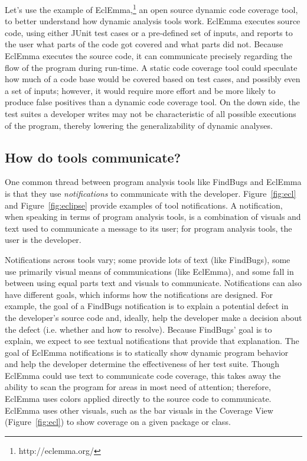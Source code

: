 \documentclass{llncs}
\begin{document}
Let's use the example of EclEmma,\footnote{http://eclemma.org/} an open source dynamic code coverage tool, to better understand how dynamic analysis tools work. EclEmma executes source code, using either JUnit test cases or a pre-defined set of inputs, and reports to the user what parts of the code got covered and what parts did not. Because EclEmma executes the source code, it can communicate precisely regarding the flow of the program during run-time. A static code coverage tool could speculate how much of a code base would be covered based on test cases, and possibly even a set of inputs; however, it would require more effort and be more likely to produce false positives than a dynamic code coverage tool. On the down side, the test suites a developer writes may not be characteristic of all possible executions of the program, thereby lowering the generalizability of dynamic analyses.

\subsection{How do tools communicate?}\label{subsec:comm}

One common thread between program analysis tools like FindBugs and EclEmma is that they use \emph{notifications} to communicate with the developer. Figure~\ref{fig:ecl} and Figure~\ref{fig:eclipse} provide examples of tool notifications. A notification, when speaking in terms of program analysis tools, is a combination of visuals and text used to communicate a message to its user; for program analysis tools, the user is the developer.

Notifications across tools vary; some provide lots of text (like FindBugs), some use primarily visual means of communications (like EclEmma), and some fall in between using equal parts text and visuals to communicate. Notifications can also have different goals, which informs how the notifications are designed. For example, the goal of a FindBugs notification is to explain a potential defect in the developer's source code and, ideally, help the developer make a decision about the defect (i.e. whether and how to resolve). Because FindBugs' goal is to explain, we expect to see textual notifications that provide that explanation.
The goal of EclEmma notifications is to statically show dynamic program behavior and help the developer determine the effectiveness of her test suite. Though EclEmma could use text to communicate code coverage, this takes away the ability to scan the program for areas in most need of attention; therefore, EclEmma uses colors applied directly to the source code to communicate. EclEmma uses other visuals, such as the bar visuals in the Coverage View (Figure~\ref{fig:ecl}) to show coverage on a given package or class.
\end{document}
